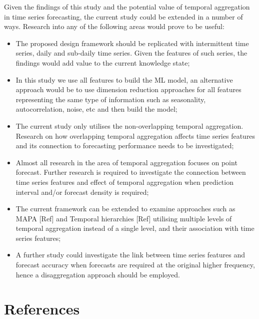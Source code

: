 \documentclass[]{elsarticle} %
\begin{document}
Given the findings of this study and the potential value of temporal
aggregation in time series forecasting, the current study could be
extended in a number of ways. Research into any of the following areas
would prove to be useful:

\begin{itemize}
\item
  The proposed design framework should be replicated with intermittent
  time series, daily and sub-daily time series. Given the features of
  such series, the findings would add value to the current knowledge
  state;
\item
  In this study we use all features to build the ML model, an
  alternative approach would be to use dimension reduction approaches
  for all features representing the same type of information such as
  seasonality, autocorrelation, noise, etc and then build the model;
\item
  The current study only utilises the non-overlapping temporal
  aggregation. Research on how overlapping temporal aggregation affects
  time series features and its connection to forecasting performance
  needs to be investigated;
\item
  Almost all research in the area of temporal aggregation focuses on
  point forecast. Further research is required to investigate the
  connection between time series features and effect of temporal
  aggregation when prediction interval and/or forecast density is
  required;
\item
  The current framework can be extended to examine approaches such as
  MAPA {[}Ref{]} and Temporal hierarchies {[}Ref{]} utilising multiple
  levels of temporal aggregation instead of a single level, and their
  association with time series features;
\item
  A further study could investigate the link between time series
  features and forecast accuracy when forecasts are required at the
  original higher frequency, hence a disaggregation approach should be
  employed.
\end{itemize}

\hypertarget{references}{%
\section*{References}\label{references}}
\end{document}
